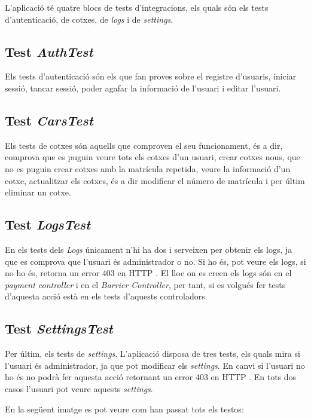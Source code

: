 L'aplicació té quatre blocs de tests d'integracions, els quals són els tests d'autenticació, de cotxes, de \emph{logs} i de \emph{settings}.

\subsection{Test \emph{AuthTest}}

Els tests d'autenticació són els que fan proves sobre el registre d'usuaris, iniciar sessió,
tancar sessió, poder agafar la informació de l'usuari i editar l'usuari.

\subsection{Test \emph{CarsTest}}

Els tests de cotxes són aquells que comproven el seu funcionament, és a dir, comprova que
es puguin veure tots els cotxes d'un usuari, crear cotxes nous, que no es puguin crear cotxes
amb la matrícula repetida, veure la informació d'un cotxe, actualitzar els cotxes, és a dir
modificar el número de matrícula i per últim eliminar un cotxe.

\subsection{Test \emph{LogsTest}}
En els tests dels \emph{Logs} únicament n'hi ha dos i serveixen per obtenir els logs, ja que es
comprova que l'usuari és administrador o no. Si ho és, pot veure els logs, si no ho és, retorna un error
403 en HTTP \autocite{http_403_response}. El lloc on es creen els logs són en el
\emph{payment controller} i en el \emph{Barrier Controller}, per tant, si es volgués fer
tests d'aquesta acció està en els tests d'aquests controladors.

\subsection{Test \emph{SettingsTest}}

Per últim, els tests de \emph{settings}. L'aplicació disposa de tres tests, els quals
mira si l'usuari és administrador, ja que pot modificar els \emph{settings}. En canvi
si l'usuari no ho és no podrà fer aquesta acció retornant un error 403 en HTTP \autocite{http_403_response}.
En tots dos casos l'usuari pot veure aquests \emph{settings}.

En la següent imatge es pot veure com han passat tots els testos:

